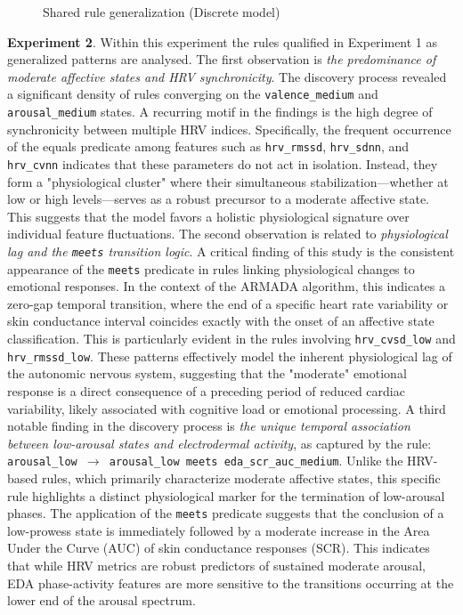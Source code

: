\documentclass{isd}
\begin{document}
{\begin{figure}[thb!]
    \caption{Shared rule generalization (Discrete model)}
    \label{fig:combined_heatmaps_discrete}
\end{figure}


\textbf{Experiment 2}. Within this experiment the rules qualified in Experiment 1 as generalized patterns are analysed. The first observation is \textit{the predominance of moderate affective states and HRV synchronicity}. The discovery process revealed a significant density of rules converging on the \texttt{valence\_medium} and \texttt{arousal\_medium} states. A recurring motif in the findings is the high degree of synchronicity between multiple HRV indices. Specifically, the frequent occurrence of the equals predicate among features such as \texttt{hrv\_rmssd}, \texttt{hrv\_sdnn}, and \texttt{hrv\_cvnn} indicates that these parameters do not act in isolation. Instead, they form a "physiological cluster" where their simultaneous stabilization—whether at low or high levels—serves as a robust precursor to a moderate affective state. This suggests that the model favors a holistic physiological signature over individual feature fluctuations. The second observation is related to \textit{physiological lag and the \texttt{meets} transition logic}. A critical finding of this study is the consistent appearance of the \texttt{meets} predicate in rules linking physiological changes to emotional responses. In the context of the ARMADA algorithm, this indicates a zero-gap temporal transition, where the end of a specific heart rate variability or skin conductance interval coincides exactly with the onset of an affective state classification. This is particularly evident in the rules involving \texttt{hrv\_cvsd\_low} and \texttt{hrv\_rmssd\_low}. These patterns effectively model the inherent physiological lag of the autonomic nervous system, suggesting that the "moderate" emotional response is a direct consequence of a preceding period of reduced cardiac variability, likely associated with cognitive load or emotional processing. A third notable finding in the discovery process is \textit{the unique temporal association between low-arousal states and electrodermal activity}, as captured by the rule: \texttt{arousal\_low $\rightarrow$ arousal\_low meets eda\_scr\_auc\_medium}. Unlike the HRV-based rules, which primarily characterize moderate affective states, this specific rule highlights a distinct physiological marker for the termination of low-arousal phases. The application of the \texttt{meets} predicate suggests that the conclusion of a low-prowess state is immediately followed by a moderate increase in the Area Under the Curve (AUC) of skin conductance responses (SCR). This indicates that while HRV metrics are robust predictors of sustained moderate arousal, EDA phase-activity features are more sensitive to the transitions occurring at the lower end of the arousal spectrum.

}
\end{document}
